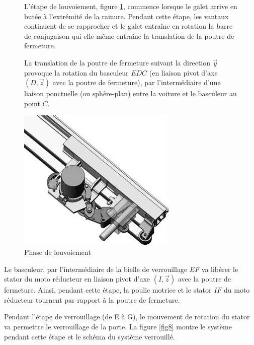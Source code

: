 \begin{figure}[!h]
\begin{minipage}{0.6\linewidth}
L'étape de louvoiement, figure \ref{fig7}, commence lorsque le galet arrive en butée à l'extrémité de la rainure. Pendant cette étape, les vantaux continuent de se rapprocher et le galet entraîne en rotation la barre de conjugaison qui elle-même entraîne la translation de la poutre de fermeture.

La translation de la poutre de fermeture suivant la direction $\overrightarrow{y}$ provoque la rotation du basculeur $EDC$ (en liaison pivot d'axe $(D,\overrightarrow{z})$ avec la poutre de fermeture), par l'intermédiaire d'une liaison ponctuelle (ou sphère-plan) entre la voiture et le basculeur au point $C$.
\end{minipage}
\hfill
\begin{minipage}{0.35\linewidth}
 \centering\includegraphics[width=0.8\linewidth]{img/Portes8.png}
 \caption{Phase de louvoiement}
 \label{fig7}
 \end{minipage}
\end{figure}

Le basculeur, par l'intermédiaire de la bielle de verrouillage $EF$ va libérer le \og stator \fg du moto réducteur en liaison pivot d'axe $(I,\overrightarrow{z})$ avec la poutre de fermeture. Ainsi, pendant cette étape, la poulie motrice et le \og stator \fg $IF$ du moto réducteur tournent par rapport à la poutre de fermeture.

Pendant l'étape de verrouillage (de E à G), le mouvement de rotation du \og stator \fg va permettre le verrouillage de la porte. La figure \ref{fig8} montre le système pendant cette étape et le schéma du système verrouillé.

